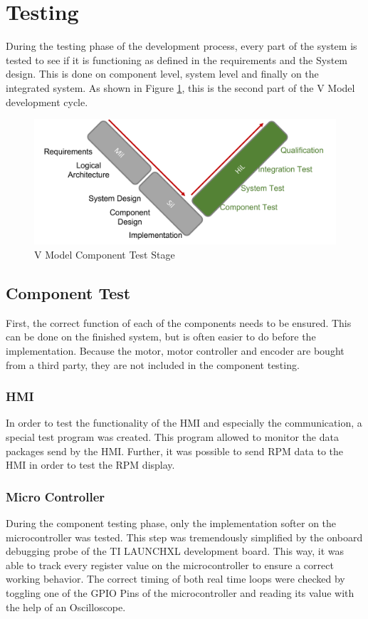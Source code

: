 \section{Testing}
During the testing phase of the development process, every part of the system is tested to see if it is functioning as defined in the requirements and the System design. This is done on component level, system level and finally on the integrated system. As shown in Figure \ref{V Model Component Test}, this is the second part of the V Model development cycle.
 
\begin{figure}
    \begin{center}
    \includegraphics[width=12cm]{Pictures/V Model Component Test.png}
    \caption[V Model Component Test]{V Model Component Test Stage}
    \label{V Model Component Test}
    \end{center}
\end{figure}
 
\subsection{Component Test}
First, the correct function of each of the components needs to be ensured. This can be done on the finished system, but is often easier to do before the implementation.
Because the motor, motor controller and encoder are bought from a third party, they are not included in the component testing.
 
\subsubsection{HMI}
In order to test the functionality of the HMI and especially the communication, a special test program was created. This program allowed to monitor the data packages send by the HMI. Further, it was possible to send RPM data to the HMI in order to test the RPM display.
 
\subsubsection{Micro Controller}
During the component testing phase, only the implementation softer on the microcontroller was tested. This step was tremendously simplified by the onboard debugging probe of the TI LAUNCHXL development board. This way, it was able to track every register value on the microcontroller to ensure a correct working behavior.
The correct timing of both real time loops were checked by toggling one of the GPIO Pins of the microcontroller and reading its value with the help of an Oscilloscope.
 
